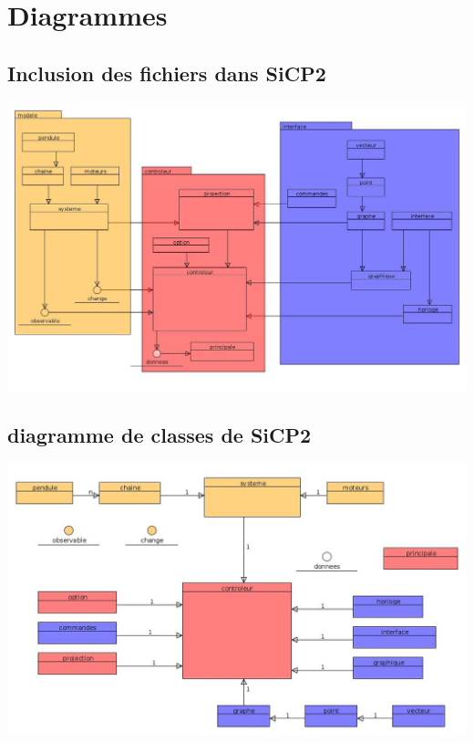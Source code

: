 %
\section{Diagrammes}
%
%
\subsection{Inclusion des fichiers dans SiCP2}
%
\begin{center}
\includegraphics[scale=0.361]{./illustration/inclusionsSiCP2}
\end{center}
%
\subsection{diagramme de classes de SiCP2}
\begin{center}
\includegraphics[scale=0.461]{./illustration/classesSiCP2}
\end{center}
%



